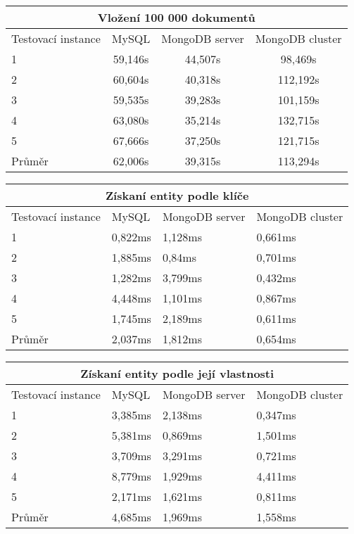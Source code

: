 \begin{table}[h]
\centering
\begin{tabular}{ | l | c | c | c | }
\hline
\multicolumn{4}{|c|}{Vložení 100 000 dokumentů} \\ \hline
Testovací instance &MySQL&MongoDB server & MongoDB cluster \\ \hline
1 & 59,146s & 44,507s & 98,469s \\ \hline
2 & 60,604s & 40,318s & 112,192s \\ \hline
3 & 59,535s & 39,283s & 101,159s \\ \hline
4 & 63,080s & 35,214s & 132,715s \\ \hline
5 & 67,666s & 37,250s & 121,715s \\ \hline
Průměr & 62,006s & 39,315s& 113,294s\\ \hline
\end{tabular}
\end{table}

\begin{table}[h]
\centering
\begin{tabular}{ | l | l | l | l | }
\hline
\multicolumn{4}{|c|}{Získaní entity podle klíče} \\ \hline
Testovací instance &MySQL&MongoDB server & MongoDB cluster \\ \hline
1 & 0,822ms & 1,128ms & 0,661ms \\ \hline
2 & 1,885ms & 0,84ms & 0,701ms \\ \hline
3 & 1,282ms & 3,799ms & 0,432ms \\ \hline
4 & 4,448ms & 1,101ms & 0,867ms \\ \hline
5 & 1,745ms & 2,189ms & 0,611ms \\ \hline 
Průměr & 2,037ms & 1,812ms & 0,654ms \\ \hline
\end{tabular}
\end{table}

\begin{table}[h]
\centering
\begin{tabular}{ | l | l | l | l | }
\hline
\multicolumn{4}{|c|}{Získaní entity podle její vlastnosti} \\ \hline
Testovací instance &MySQL&MongoDB server & MongoDB cluster \\ \hline
1 & 3,385ms & 2,138ms & 0,347ms \\ \hline 
2 & 5,381ms & 0,869ms & 1,501ms \\ \hline
3 & 3,709ms & 3,291ms & 0,721ms \\ \hline
4 & 8,779ms & 1,929ms & 4,411ms \\ \hline
5 & 2,171ms & 1,621ms & 0,811ms \\ \hline
Průměr & 4,685ms & 1,969ms & 1,558ms \\ \hline
\end{tabular}
\end{table}

